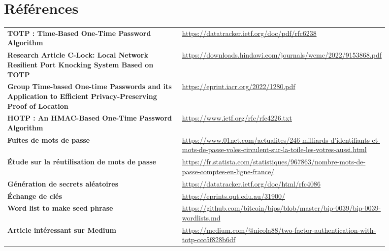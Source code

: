 \documentclass[a4paper, 10pt]{article}
\newcommand{\totp}{\textsc{TOTP} }
\newcommand{\hotp}{\textsc{HOTP} }
\begin{document}
\newpage
\section{Références}

\renewcommand{\arraystretch}{2.5}

\begin{tabular}{p{0.5\linewidth}p{0.4\linewidth}}
   \textbf{\totp: Time-Based One-Time Password Algorithm} & \url{https://datatracker.ietf.org/doc/pdf/rfc6238} \\
   
   \textbf{Research Article C-Lock: Local Network Resilient Port Knocking System Based on TOTP} & \url{https://downloads.hindawi.com/journals/wcmc/2022/9153868.pdf} \\
   
   \textbf{Group Time-based One-time Passwords and its Application to Efficient Privacy-Preserving Proof of Location} & \url{https://eprint.iacr.org/2022/1280.pdf} \\
   
   \textbf{\hotp: An HMAC-Based One-Time Password Algorithm} & \url{https://www.ietf.org/rfc/rfc4226.txt} \\
   
   \textbf{Fuites de mots de passe} & \url{https://www.01net.com/actualites/246-milliards-d'identifiants-et-mots-de-passe-voles-circulent-sur-la-toile-les-votres-aussi.html} \\
   
   \textbf{Étude sur la réutilisation de mots de passe} & \url{https://fr.statista.com/statistiques/967863/nombre-mots-de-passe-comptes-en-ligne-france/} \\
   
   \textbf{Génération de secrets aléatoires} & \url{https://datatracker.ietf.org/doc/html/rfc4086} \\
   
   \textbf{Échange de clés} & \url{https://eprints.qut.edu.au/31900/} \\
   
   \textbf{Word list to make seed phrase} & \url{https://github.com/bitcoin/bips/blob/master/bip-0039/bip-0039-wordlists.md} \\
   
   \textbf{Article intéressant sur Medium} & \url{https://medium.com/@nicola88/two-factor-authentication-with-totp-ccc5f828b6df} \\
   

\end{tabular}
\end{document}
